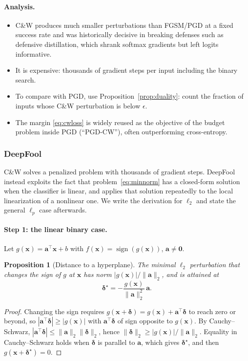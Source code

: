 \documentclass[10pt,a4paper]{extarticle}
\newtheorem{proposition}[theorem]{Proposition}
\theoremstyle{definition}
\newcommand{\x}{\mathbf{x}}
\newcommand{\bdelta}{\boldsymbol{\delta}}
\DeclareMathOperator{\sign}{sign}
\begin{document}
\paragraph{Analysis.}
\begin{itemize}
  \item C\&W produces much smaller perturbations than FGSM/PGD at a fixed success rate and was historically decisive in breaking defenses such as defensive distillation, which shrank softmax gradients but left logits informative.
  \item It is expensive: thousands of gradient steps per input including the binary search.
  \item To compare with PGD, use Proposition~\ref{prop:duality}: count the fraction of inputs whose C\&W perturbation is below \(\epsilon\).
  \item The margin \eqref{eq:cwloss} is widely reused as the objective of the budget problem inside PGD (\enquote{PGD-CW}), often outperforming cross-entropy.
\end{itemize}

\subsubsection{DeepFool}\label{sec:deepfool}

C\&W solves a penalized problem with thousands of gradient steps. DeepFool \citep{moosavi2016deepfool} instead exploits the fact that problem~\eqref{eq:minnorm} has a closed-form solution when the classifier is linear, and applies that solution repeatedly to the local linearization of a nonlinear one. We write the derivation for \(\ell_2\) and state the general \(\ell_p\) case afterwards.

\paragraph{Step 1: the linear binary case.} Let \(g(\x)=\mathbf{a}^\top\x+b\) with \(f(\x)=\sign(g(\x))\), \(\mathbf{a}\neq\mathbf{0}\).

\begin{proposition}[Distance to a hyperplane]\label{prop:hyperplane}
The minimal \(\ell_2\) perturbation that changes the sign of \(g\) at \(\x\) has norm \(|g(\x)|/\|\mathbf{a}\|_2\), and is attained at
\[
\bdelta^\star=-\frac{g(\x)}{\|\mathbf{a}\|_2^2}\,\mathbf{a}.
\]
\end{proposition}

\begin{proof}
Changing the sign requires \(g(\x+\bdelta)=g(\x)+\mathbf{a}^\top\bdelta\) to reach zero or beyond, so \(|\mathbf{a}^\top\bdelta|\ge|g(\x)|\) with \(\mathbf{a}^\top\bdelta\) of sign opposite to \(g(\x)\). By Cauchy--Schwarz, \(|\mathbf{a}^\top\bdelta|\le\|\mathbf{a}\|_2\|\bdelta\|_2\), hence \(\|\bdelta\|_2\ge|g(\x)|/\|\mathbf{a}\|_2\). Equality in Cauchy--Schwarz holds when \(\bdelta\) is parallel to \(\mathbf{a}\), which gives \(\bdelta^\star\), and then \(g(\x+\bdelta^\star)=0\).
\end{proof}
\end{document}
